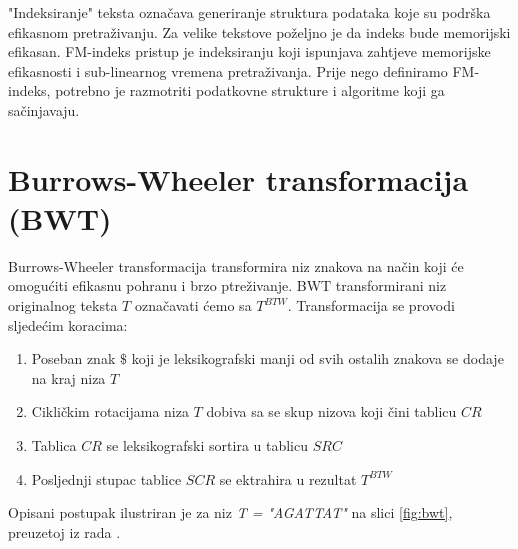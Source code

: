 \documentclass[times, utf8, seminar, numeric]{fer}
\begin{document}
"Indeksiranje" teksta označava generiranje struktura podataka koje su podrška efikasnom
pretraživanju. Za velike tekstove poželjno je da indeks bude memorijski efikasan.
FM-indeks \cite{Ferragina00opportunisticdata} pristup je indeksiranju koji ispunjava
zahtjeve memorijske efikasnosti i sub-linearnog vremena pretraživanja. Prije nego definiramo
FM-indeks, potrebno je razmotriti podatkovne strukture i algoritme koji ga sačinjavaju.

\section{Burrows-Wheeler transformacija (BWT)}

Burrows-Wheeler transformacija \cite{btw_1994} transformira niz znakova na način koji
će omogućiti efikasnu pohranu i brzo ptreživanje. BWT transformirani niz originalnog
teksta $T$ označavati ćemo sa $T^{BTW}$. Transformacija se provodi sljedećim koracima:

\begin{enumerate}
  \item{Poseban znak $\$$ koji je leksikografski manji od svih ostalih znakova se dodaje na kraj niza $T$}
  \item{Cikličkim rotacijama niza $T$ dobiva sa se skup nizova koji čini tablicu $CR$ }
  \item{Tablica $CR$ se leksikografski sortira u tablicu $SRC$}
  \item{Posljednji stupac tablice $SCR$ se ektrahira u rezultat $T^{BTW}$}
\end{enumerate}

Opisani postupak ilustriran je za niz \textit{T = "AGATTAT"} na slici \ref{fig:bwt}, preuzetoj iz rada
\cite{singer_2012}.
\end{document}
